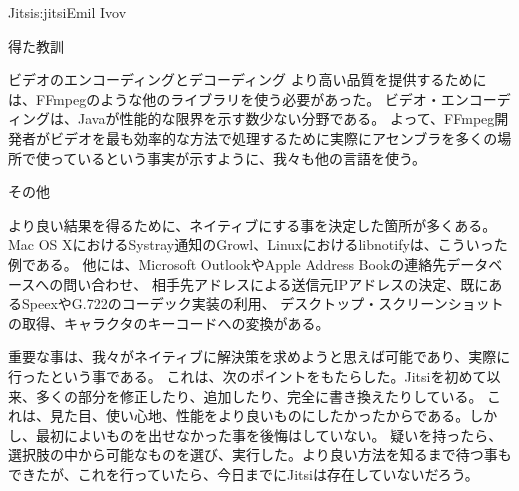\begin{aosachapter}{Jitsi}{s:jitsi}{Emil Ivov}
\begin{aosasect1}{得た教訓}
\begin{aosasect2}{ビデオのエンコーディングとデコーディング}
より高い品質を提供するためには、FFmpegのような他のライブラリを使う必要があった。
ビデオ・エンコーディングは、Javaが性能的な限界を示す数少ない分野である。
よって、FFmpeg開発者がビデオを最も効率的な方法で処理するために実際にアセンブラを多くの場所で使っているという事実が示すように、我々も他の言語を使う。

\end{aosasect2}

\begin{aosasect2}{その他}

より良い結果を得るために、ネイティブにする事を決定した箇所が多くある。
Mac OS XにおけるSystray通知のGrowl、Linuxにおけるlibnotifyは、こういった例である。
他には、Microsoft OutlookやApple Address Bookの連絡先データベースへの問い合わせ、
相手先アドレスによる送信元IPアドレスの決定、既にあるSpeexやG.722のコーデック実装の利用、
デスクトップ・スクリーンショットの取得、キャラクタのキーコードへの変換がある。

\end{aosasect2}

重要な事は、我々がネイティブに解決策を求めようと思えば可能であり、実際に行ったという事である。
これは、次のポイントをもたらした。Jitsiを初めて以来、多くの部分を修正したり、追加したり、完全に書き換えたりしている。
これは、見た目、使い心地、性能をより良いものにしたかったからである。しかし、最初によいものを出せなかった事を後悔はしていない。
疑いを持ったら、選択肢の中から可能なものを選び、実行した。より良い方法を知るまで待つ事もできたが、これを行っていたら、今日までにJitsiは存在していないだろう。


\end{aosasect1}
\end{aosachapter}
